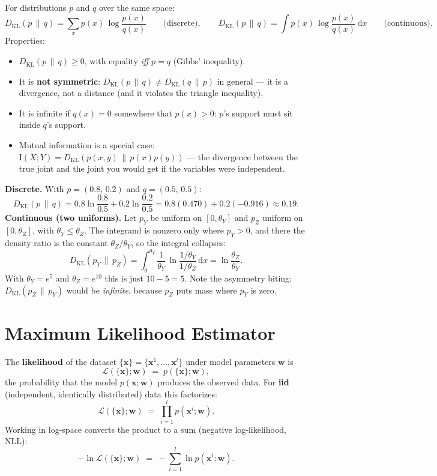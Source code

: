 \documentclass[11pt, oneside]{book}
\newcommand{\KL}[2]{D_{\mathrm{KL}}\!\left(#1 \,\|\, #2\right)}
\newcommand{\MI}{\mathrm{I}}
\newcommand{\dd}{\,\mathrm{d}}
\newcommand{\wvec}{\bm{w}}
\newcommand{\xvec}{\bm{x}}
\newcommand{\lhood}{\mathcal{L}}
\begin{document}
\begin{defbox}[title={Kullback--Leibler Divergence}]
For distributions $p$ and $q$ over the same space:
\[
  \KL{p}{q} = \sum_{x} p(x)\,\log\frac{p(x)}{q(x)}
  \qquad\text{(discrete)},
  \qquad
  \KL{p}{q} = \int p(x)\,\log\frac{p(x)}{q(x)}\dd x
  \qquad\text{(continuous)}.
\]
Properties:
\begin{itemize}
  \item $\KL{p}{q} \geq 0$, with equality \emph{iff} $p = q$ (Gibbs' inequality).
  \item It is \textbf{not symmetric}: $\KL{p}{q} \neq \KL{q}{p}$ in general ---
        it is a divergence, not a distance (and it violates the triangle inequality).
  \item It is infinite if $q(x) = 0$ somewhere that $p(x) > 0$: $p$'s support must
        sit inside $q$'s support.
  \item Mutual information is a special case:
        $\MI(X;Y) = \KL{p(x,y)}{p(x)p(y)}$ --- the divergence between the true
        joint and the joint you would get if the variables were independent.
\end{itemize}
\end{defbox}

\begin{exbox}[title={Two KL computations you should be able to do cold}]
\textbf{Discrete.} With $p=(0.8,\,0.2)$ and $q=(0.5,\,0.5)$:
\[
  \KL{p}{q}
  = 0.8\ln\frac{0.8}{0.5} + 0.2\ln\frac{0.2}{0.5}
  = 0.8(0.470) + 0.2(-0.916)
  \approx 0.19.
\]
\textbf{Continuous (two uniforms).} Let $p_Y$ be uniform on $[0,\theta_Y]$ and
$p_Z$ uniform on $[0,\theta_Z]$, with $\theta_Y \leq \theta_Z$.
The integrand is nonzero only where $p_Y>0$, and there the density ratio is the
constant $\theta_Z/\theta_Y$, so the integral collapses:
\[
  \KL{p_Y}{p_Z}
  = \int_0^{\theta_Y}\frac{1}{\theta_Y}\,\ln\frac{1/\theta_Y}{1/\theta_Z}\dd x
  = \ln\frac{\theta_Z}{\theta_Y}.
\]
With $\theta_Y=e^{5}$ and $\theta_Z=e^{10}$ this is just $10-5=5$.
Note the asymmetry biting: $\KL{p_Z}{p_Y}$ would be \emph{infinite}, because
$p_Z$ puts mass where $p_Y$ is zero.
\end{exbox}


\section{Maximum Likelihood Estimator}
\label{sec:mle}

\begin{defbox}[title={Likelihood}]
The \textbf{likelihood} of the dataset $\{\xvec\} = \{\xvec^1,\ldots,\xvec^l\}$ under
model parameters $\wvec$ is
\[
  \lhood(\{\xvec\};\wvec) \;=\; p(\{\xvec\};\wvec),
\]
the probability that the model $p(\xvec;\wvec)$ produces the observed data.
For \textbf{iid} (independent, identically distributed) data this factorizes:
\[
  \lhood(\{\xvec\};\wvec) \;=\; \prod_{i=1}^{l} p(\xvec^i;\wvec).
\]
Working in log-space converts the product to a sum (negative log-likelihood, NLL):
\[
  -\ln \lhood(\{\xvec\};\wvec) \;=\; -\sum_{i=1}^{l} \ln p(\xvec^i;\wvec).
\]
\end{defbox}
\end{document}
